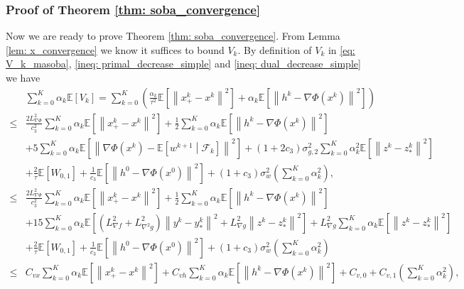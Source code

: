 \documentclass[10pt]{article}
\theoremstyle{remark}
\def\setF{\mathscr{F}} %
\newcommand{\E}{\mathbb{E}}
\newcommand{\norm}[1]{\left\|#1\right\|}
\begin{document}
\subsubsection{Proof of Theorem \ref{thm: soba_convergence}}
Now we are ready to prove Theorem \ref{thm: soba_convergence}. From Lemma \ref{lem: x_convergence} we know it suffices to bound $V_k$. By definition of $V_k$ in \eqref{eq: V_k_masoba}, \eqref{ineq: primal_decrease_simple} and \eqref{ineq: dual_decrease_simple} we have
\begin{align*}
    &\sum_{k=0}^{K}\alpha_k\E\left[V_k\right] = \sum_{k=0}^{K}\left(\frac{\alpha_k}{\tau^2}\E\left[\norm{x_+^k-x^k}^2\right] + \alpha_k\E\left[\norm{h^k - \nabla\Phi(x^k)}^2\right]\right) \\
        \leq &\frac{2L_{\nabla \Phi}^2}{c_3^2}\sum_{k=0}^{K}\alpha_k\E\left[\norm{x_+^k - x^k}^2\right]  +\frac{1}{2}\sum_{k=0}^{K}\alpha_k\E\left[\norm{h^k - \nabla\Phi(x^k)}^2\right] \\
        & + 5\sum_{k=0}^{K}\alpha_k\E\left[\norm{\nabla\Phi(x^k) - \E\left[w^{k+1}\middle|\setF_k\right]}^2\right] +  (1 + 2c_3)\sigma_{g,2}^2\sum_{k=0}^{K}\alpha_k^2\E\left[\norm{z^k - z_*^k}^2\right]\\
        &+ \frac{2}{\tau}\E\left[W_{0,1}\right] + \frac{1}{c_3}\E\left[\norm{h^0 - \nabla\Phi(x^0)}^2\right] + (1+c_3)\sigma_w^2\left(\sum_{k=0}^{K}\alpha_k^2\right), \\
        \leq &\frac{2L_{\nabla \Phi}^2}{c_3^2}\sum_{k=0}^{K}\alpha_k\E\left[\norm{x_+^k - x^k}^2\right]  +\frac{1}{2}\sum_{k=0}^{K}\alpha_k\E\left[\norm{h^k - \nabla\Phi(x^k)}^2\right]\\
         & + 15\sum_{k=0}^{K}\alpha_k\E\left[\left(L_{\nabla f}^2 + L_{\nabla^2 g}^2\right)\norm{y^k - y_*^k}^2 + L_{\nabla g}^2\norm{z^k - z_*^k}^2\right]  + L_{\nabla g}^2\sum_{k=0}^{K}\alpha_k\E\left[\norm{z^k - z_*^k}^2\right] \\
         &+ \frac{2}{\tau}\E\left[W_{0,1}\right] + \frac{1}{c_3}\E\left[\norm{h^0 - \nabla\Phi(x^0)}^2\right] + (1+c_3)\sigma_w^2\left(\sum_{k=0}^{K}\alpha_k^2\right) \\
            \leq & C_{vx}\sum_{k=0}^{K}\alpha_k \E\left[\norm{x_+^k - x^k}^2\right] + C_{vh}\sum_{k=0}^{K}\alpha_k\E\left[\norm{h^k - \nabla\Phi(x^k)}^2\right] + C_{v,0} + C_{v,1}\left(\sum_{k=0}^{K}\alpha_k^2\right),
\end{align*}
\end{document}
